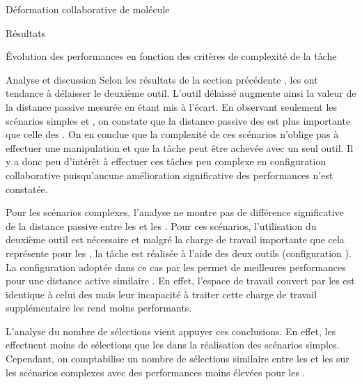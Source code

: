 \documentclass[myfrancais,ngerman,english,french]{mythesis}
\begin{document}
\begin{mychapter}{Déformation collaborative de molécule}
\begin{mysection}{Résultats}
\begin{mysubsection}{Évolution des performances en fonction des critères de complexité de la tâche}
\begin{mysubsubsection}{Analyse et discussion}
					Selon les résultats de la section précédente , les  ont tendance à délaisser le deuxième outil.
					L'outil délaissé augmente ainsi la valeur de la distance passive mesurée en étant mis à l'écart.
					En observant seulement les scénarios simples  et , on constate que la distance passive des  est plus importante que celle des .
					On en conclue que la complexité de ces scénarios n'oblige pas à effectuer une manipulation  et que la tâche peut être achevée avec un seul outil.
					Il y a donc peu d'intérêt à effectuer ces tâches peu complexe en configuration collaborative puisqu'aucune amélioration significative des performances n'est constatée.

					Pour les scénarios complexes, l'analyse ne montre pas de différence significative de la distance passive entre les  et les .
					Pour ces scénarios, l'utilisation du deuxième outil est nécessaire et malgré la charge de travail importante que cela représente pour les , la tâche est réalisée à l'aide des deux outils (configuration ).
					La configuration  adoptée dans ce cas par les  permet de meilleures performances  pour une distance active similaire .
					En effet, l'espace de travail couvert par les  est identique à celui des  mais leur incapacité à traiter cette charge de travail supplémentaire les rend moins performants.

					L'analyse du nombre de sélections vient appuyer ces conclusions.
					En effet, les  effectuent moins de sélections que les  dans la réalisation des scénarios simples.
					Cependant, on comptabilise un nombre de sélections similaire entre les  et les  sur les scénarios complexes avec des performances moins élevées pour les .


\end{mysubsubsection}
\end{mysubsection}
\end{mysection}
\end{mychapter}
\end{document}
